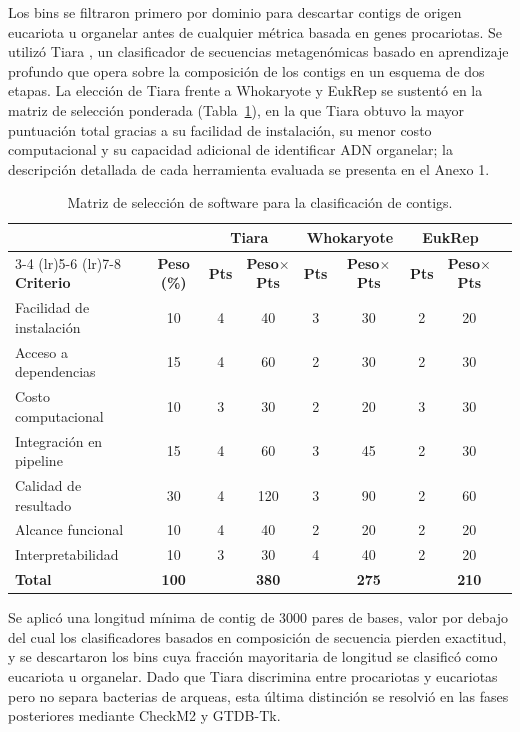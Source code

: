 Los bins se filtraron primero por dominio para descartar contigs de origen eucariota u organelar antes de cualquier métrica basada en genes procariotas. Se utilizó Tiara \cite{karlicki2022tiara}, un clasificador de secuencias metagenómicas basado en aprendizaje profundo que opera sobre la composición de los contigs en un esquema de dos etapas. La elección de Tiara frente a Whokaryote \cite{pronk2022whokaryote} y EukRep \cite{west2018genomereconstruction} se sustentó en la matriz de selección ponderada (Tabla~\ref{tab:seleccion_software}), en la que Tiara obtuvo la mayor puntuación total gracias a su facilidad de instalación, su menor costo computacional y su capacidad adicional de identificar ADN organelar; la descripción detallada de cada herramienta evaluada se presenta en el Anexo 1.

\begin{table}[H]
\centering
\footnotesize
\caption{Matriz de selección de software para la clasificación de contigs.}
\label{tab:seleccion_software}
\begin{tabular}{@{}lcccccccc@{}}
\toprule
& & \multicolumn{2}{c}{\textbf{Tiara}} & \multicolumn{2}{c}{\textbf{Whokaryote}} & \multicolumn{2}{c}{\textbf{EukRep}} \\
\cmidrule(lr){3-4} \cmidrule(lr){5-6} \cmidrule(lr){7-8}
\textbf{Criterio} & \textbf{Peso (\%)} & \textbf{Pts} & \textbf{Peso$\times$Pts} & \textbf{Pts} & \textbf{Peso$\times$Pts} & \textbf{Pts} & \textbf{Peso$\times$Pts} \\
\midrule
Facilidad de instalación & 10 & 4 & 40 & 3 & 30 & 2 & 20 \\
Acceso a dependencias & 15 & 4 & 60 & 2 & 30 & 2 & 30 \\
Costo computacional & 10 & 3 & 30 & 2 & 20 & 3 & 30 \\
Integración en pipeline & 15 & 4 & 60 & 3 & 45 & 2 & 30 \\
Calidad de resultado & 30 & 4 & 120 & 3 & 90 & 2 & 60 \\
Alcance funcional & 10 & 4 & 40 & 2 & 20 & 2 & 20 \\
Interpretabilidad & 10 & 3 & 30 & 4 & 40 & 2 & 20 \\
\midrule
\textbf{Total} & \textbf{100} & & \textbf{380} & & \textbf{275} & & \textbf{210} \\
\bottomrule
\end{tabular}
\end{table}

Se aplicó una longitud mínima de contig de 3000 pares de bases, valor por debajo del cual los clasificadores basados en composición de secuencia pierden exactitud, y se descartaron los bins cuya fracción mayoritaria de longitud se clasificó como eucariota u organelar. Dado que Tiara discrimina entre procariotas y eucariotas pero no separa bacterias de arqueas, esta última distinción se resolvió en las fases posteriores mediante CheckM2 y GTDB-Tk.


